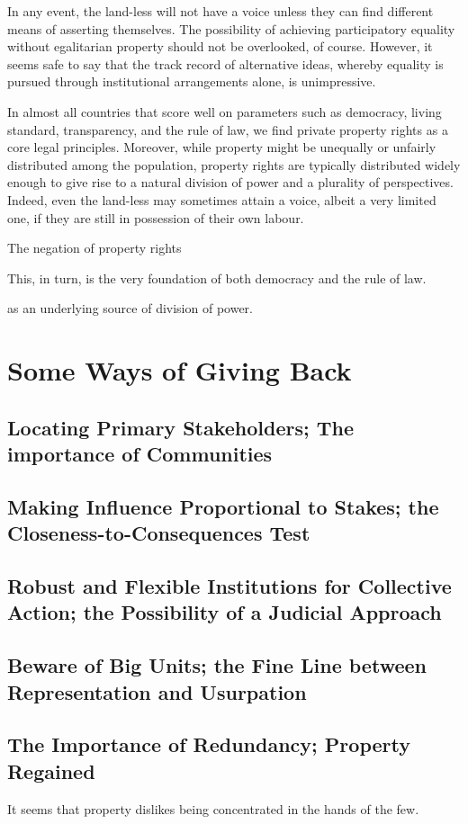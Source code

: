 In any event, the land-less will not have a voice unless they can find different means of asserting themselves. The possibility of achieving participatory equality without egalitarian property should not be overlooked, of course. However, it seems safe to say that the track record of alternative ideas, whereby equality is pursued through institutional arrangements alone, is unimpressive. 

In almost all countries that score well on parameters such as democracy, living standard, transparency, and the rule of law, we find private property rights as a core legal principles. Moreover, while property might be unequally or unfairly distributed among the population, property rights are typically distributed widely enough to give rise to a natural division of power and a plurality of perspectives. Indeed, even the land-less may sometimes attain a voice, albeit a very limited one, if they are still in possession of their own labour.

The negation of property rights

This, in turn, is the very foundation of both democracy and the rule of law.



 as an underlying source of division of power.


 
\section{Some Ways of Giving Back}

\subsection{Locating Primary Stakeholders; The importance of Communities}

\subsection{Making Influence Proportional to Stakes; the Closeness-to-Consequences Test}

\subsection{Robust and Flexible Institutions for Collective Action; the Possibility of a Judicial Approach}

\subsection{Beware of Big Units; the Fine Line between Representation and Usurpation}

\subsection{The Importance of Redundancy; Property Regained}

It seems that property dislikes being concentrated in the hands of the few. 
